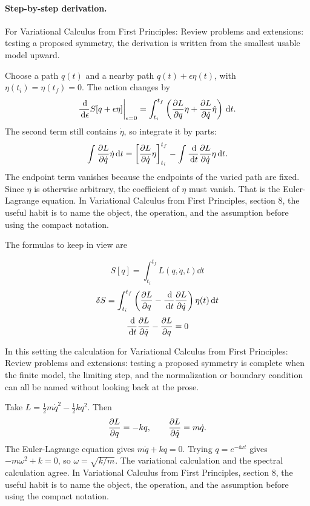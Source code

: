 \paragraph{Step-by-step derivation.}

For Variational Calculus from First Principles: Review problems and extensions: testing a proposed symmetry, the derivation is written from the smallest usable model upward.

Choose a path \(q(t)\) and a nearby path \(q(t)+\epsilon\eta(t)\), with \(\eta(t_i)=\eta(t_f)=0\).  The action changes by
\[
  \frac{\,\mathrm d}{\,\mathrm d\epsilon}S[q+\epsilon\eta]\bigg|_{\epsilon=0}
  =
  \int_{t_i}^{t_f}
  \left(
  \frac{\partial L}{\partial q}\eta+\frac{\partial L}{\partial\dot q}\dot\eta
  \right)\,\mathrm d t.
\]
The second term still contains \(\dot\eta\), so integrate it by parts:
\[
  \int \frac{\partial L}{\partial\dot q}\dot\eta\,\mathrm d t
  =
  \left[\frac{\partial L}{\partial\dot q}\eta\right]_{t_i}^{t_f}
  -
  \int \frac{\,\mathrm d}{\,\mathrm d t}\frac{\partial L}{\partial\dot q}\eta\,\mathrm d t.
\]
The endpoint term vanishes because the endpoints of the varied path are fixed.  Since \(\eta\) is otherwise arbitrary, the coefficient of \(\eta\) must vanish.  That is the Euler-Lagrange equation.  In Variational Calculus from First Principles, section 8, the useful habit is to name the object, the operation, and the assumption before using the compact notation.

The formulas to keep in view are

\[
  S[q]=\int_{t_i}^{t_f}L(q,\dot q,t)\dd t
\]
\[
  \delta S=\int_{t_i}^{t_f}\left(\frac{\partial L}{\partial q}-\frac{\,\mathrm d}{\,\mathrm d t}\frac{\partial L}{\partial\dot q}\right)\eta(t)\,\mathrm d t
\]
\[
  \frac{\,\mathrm d}{\,\mathrm d t}\frac{\partial L}{\partial\dot q}-\frac{\partial L}{\partial q}=0
\]

In this setting the calculation for Variational Calculus from First Principles: Review problems and extensions: testing a proposed symmetry is complete when the finite model, the limiting step, and the normalization or boundary condition can all be named without looking back at the prose.




\begin{example}
Take \(L=\frac12m\dot q^2-\frac12kq^2\).  Then
\[
  \frac{\partial L}{\partial q}=-kq,\qquad \frac{\partial L}{\partial\dot q}=m\dot q.
\]
The Euler-Lagrange equation gives \(m\ddot q+kq=0\).  Trying \(q=e^{-\ii\omega t}\) gives \(-m\omega^2+k=0\), so \(\omega=\sqrt{k/m}\).  The variational calculation and the spectral calculation agree.  In Variational Calculus from First Principles, section 8, the useful habit is to name the object, the operation, and the assumption before using the compact notation.
\end{example}



